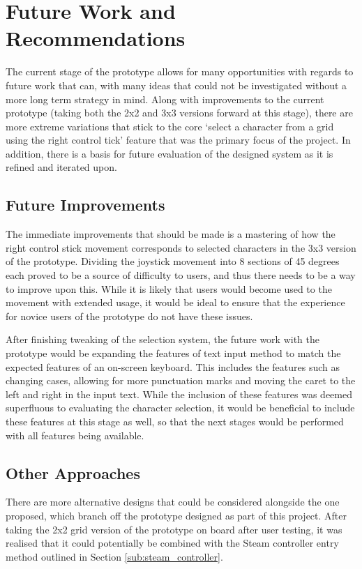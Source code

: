 \documentclass[future.tex]{subfiles}
\begin{document}
\section{Future Work and Recommendations} %
\label{sec:future_work_and_recommendations}
The current stage of the prototype allows for many opportunities with regards
to future work that can, with many ideas that could not be investigated without
a more long term strategy in mind. Along with improvements to the current
prototype (taking both the 2x2 and 3x3 versions forward at this stage), there
are more extreme variations that stick to the core `select a character from a
grid using the right control tick' feature that was the primary focus of the
project. In addition, there is a basis for future evaluation of the designed
system as it is refined and iterated upon.

\subsection{Future Improvements} %
\label{sub:future_improvements}
The immediate improvements that should be made is a mastering of how the right
control stick movement corresponds to selected characters in the 3x3 version of
the prototype. Dividing the joystick movement into 8 sections of 45 degrees each proved to be a source of difficulty to users, and thus there needs to be a way
to improve upon this. While it is likely that users would become used to the
movement with extended usage, it would be ideal to ensure that the experience
for novice users of the prototype do not have these issues.

After finishing tweaking of the selection system, the future work with the
prototype would be expanding the features of text input method to match the
expected features of an on-screen keyboard. This includes the features such as
changing cases, allowing for more punctuation marks and moving the caret to the
left and right in the input text. While the inclusion of these features was
deemed superfluous to evaluating the character selection, it would be beneficial
to include these features at this stage as well, so that the next stages would
be performed with all features being available.

\subsection{Other Approaches} %
\label{sub:other_approaches}
There are more alternative designs that could be considered alongside the one
proposed, which branch off the prototype designed as part of this project.
After taking the 2x2 grid version of the prototype on board after user testing,
it was realised that it could potentially be combined with the Steam controller
entry method outlined in Section \ref{sub:steam_controller}.
\end{document}
